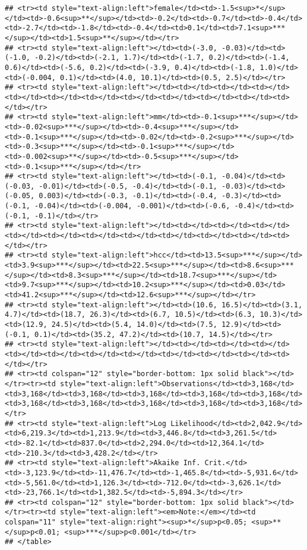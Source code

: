 \documentclass[]{article}
\begin{document}
\begin{verbatim}
## <tr><td style="text-align:left">female</td><td>-1.5<sup>*</sup></td><td>-0.6<sup>**</sup></td><td>-0.2</td><td>-0.7</td><td>-0.4</td><td>-2.7</td><td>-1.8</td><td>-0.4</td><td>0.1</td><td>7.1<sup>***</sup></td><td>1.5<sup>**</sup></td></tr>
## <tr><td style="text-align:left"></td><td>(-3.0, -0.03)</td><td>(-1.0, -0.2)</td><td>(-2.1, 1.7)</td><td>(-1.7, 0.2)</td><td>(-1.4, 0.6)</td><td>(-5.6, 0.2)</td><td>(-3.9, 0.4)</td><td>(-1.8, 1.0)</td><td>(-0.004, 0.1)</td><td>(4.0, 10.1)</td><td>(0.5, 2.5)</td></tr>
## <tr><td style="text-align:left"></td><td></td><td></td><td></td><td></td><td></td><td></td><td></td><td></td><td></td><td></td><td></td></tr>
## <tr><td style="text-align:left">mm</td><td>-0.1<sup>***</sup></td><td>-0.02<sup>***</sup></td><td>-0.4<sup>***</sup></td><td>-0.1<sup>***</sup></td><td>-0.02</td><td>-0.2<sup>***</sup></td><td>-0.3<sup>***</sup></td><td>-0.1<sup>***</sup></td><td>-0.002<sup>**</sup></td><td>-0.5<sup>***</sup></td><td>-0.1<sup>***</sup></td></tr>
## <tr><td style="text-align:left"></td><td>(-0.1, -0.04)</td><td>(-0.03, -0.01)</td><td>(-0.5, -0.4)</td><td>(-0.1, -0.03)</td><td>(-0.05, 0.003)</td><td>(-0.3, -0.1)</td><td>(-0.4, -0.3)</td><td>(-0.1, -0.04)</td><td>(-0.004, -0.001)</td><td>(-0.6, -0.4)</td><td>(-0.1, -0.1)</td></tr>
## <tr><td style="text-align:left"></td><td></td><td></td><td></td><td></td><td></td><td></td><td></td><td></td><td></td><td></td><td></td></tr>
## <tr><td style="text-align:left">hcc</td><td>13.5<sup>***</sup></td><td>3.9<sup>***</sup></td><td>22.5<sup>***</sup></td><td>8.6<sup>***</sup></td><td>8.3<sup>***</sup></td><td>18.7<sup>***</sup></td><td>9.7<sup>***</sup></td><td>10.2<sup>***</sup></td><td>0.03</td><td>41.2<sup>***</sup></td><td>12.6<sup>***</sup></td></tr>
## <tr><td style="text-align:left"></td><td>(10.6, 16.5)</td><td>(3.1, 4.7)</td><td>(18.7, 26.3)</td><td>(6.7, 10.5)</td><td>(6.3, 10.3)</td><td>(12.9, 24.5)</td><td>(5.4, 14.0)</td><td>(7.5, 12.9)</td><td>(-0.1, 0.1)</td><td>(35.2, 47.2)</td><td>(10.7, 14.5)</td></tr>
## <tr><td style="text-align:left"></td><td></td><td></td><td></td><td></td><td></td><td></td><td></td><td></td><td></td><td></td><td></td></tr>
## <tr><td colspan="12" style="border-bottom: 1px solid black"></td></tr><tr><td style="text-align:left">Observations</td><td>3,168</td><td>3,168</td><td>3,168</td><td>3,168</td><td>3,168</td><td>3,168</td><td>3,168</td><td>3,168</td><td>3,168</td><td>3,168</td><td>3,168</td></tr>
## <tr><td style="text-align:left">Log Likelihood</td><td>2,042.9</td><td>6,219.3</td><td>1,213.9</td><td>3,446.8</td><td>3,261.5</td><td>-82.1</td><td>837.0</td><td>2,294.0</td><td>12,364.1</td><td>-210.3</td><td>3,428.2</td></tr>
## <tr><td style="text-align:left">Akaike Inf. Crit.</td><td>-3,123.9</td><td>-11,476.7</td><td>-1,465.8</td><td>-5,931.6</td><td>-5,561.0</td><td>1,126.3</td><td>-712.0</td><td>-3,626.1</td><td>-23,766.1</td><td>1,382.5</td><td>-5,894.3</td></tr>
## <tr><td colspan="12" style="border-bottom: 1px solid black"></td></tr><tr><td style="text-align:left"><em>Note:</em></td><td colspan="11" style="text-align:right"><sup>*</sup>p<0.05; <sup>**</sup>p<0.01; <sup>***</sup>p<0.001</td></tr>
## </table>
\end{verbatim}
\end{document}
